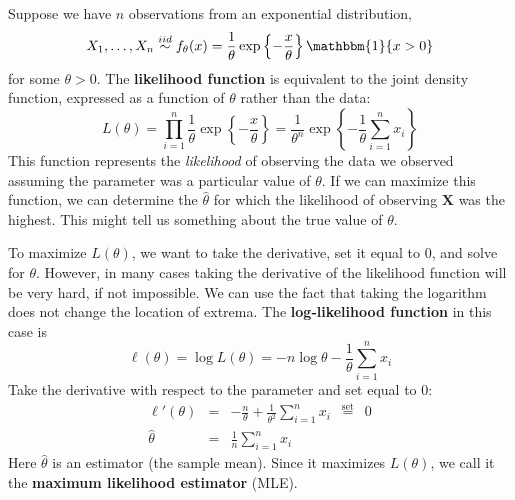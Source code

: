 \documentclass[11pt,fleqn]{book} %
\newlength\tindent
\renewcommand{\indent}{\hspace*{\tindent}}
\begin{document}
\begin{example}
	Suppose we have $n$ observations from an exponential distribution,
	$$
		X_1, \dots, X_n \stackrel{iid}{\sim} f_\theta(x)=\frac{1}{\theta}\exp\left\{-\frac{x}{\theta}\right\}\mathbbm{1}\{x>0\}
	$$
	for some $\theta > 0$. The \textbf{likelihood function} is equivalent to the joint density function, expressed as a function of $\theta$ rather than the data:
	$$
		L(\theta) = \prod_{i=1}^n \frac{1}{\theta}\exp\left\{-\frac{x}{\theta}\right\} = \frac{1}{\theta^n}\exp\left\{-\frac{1}{\theta}\sum_{i=1}^n x_i\right\}
	$$
	This function represents the \emph{likelihood} of observing the data we observed assuming the parameter was a particular value of $\theta$. If we can maximize this function, we can determine the $\hat{\theta}$ for which the likelihood of observing $\bm{X}$ was the highest. This might tell us something about the true value of $\theta$.

	\indent To maximize $L(\theta)$, we want to take the derivative, set it equal to 0, and solve for $\theta$. However, in many cases taking the derivative of the likelihood function will be very hard, if not impossible. We can use the fact that taking the logarithm does not change the location of extrema. The \textbf{log-likelihood function} in this case is
	\begin{equation*}
		\ell(\theta) = \log L(\theta) = -n \log \theta - \frac{1}{\theta} \sum_{i=1}^n x_i
	\end{equation*}
	Take the derivative with respect to the parameter and set equal to 0:
	\begin{eqnarray*}
		\ell'(\theta) &=& -\frac{n}{\theta} + \frac{1}{\theta^2} \sum_{i=1}^n x_i \enspace \stackrel{\textrm{set}}{=} \enspace 0\\
		\hat{\theta} &=& \frac{1}{n} \sum_{i=1}^n x_i
	\end{eqnarray*}
	Here $\hat{\theta}$ is an estimator (the sample mean). Since it maximizes $L(\theta)$, we call it the \textbf{maximum likelihood estimator} (MLE).
\end{example}
\end{document}
